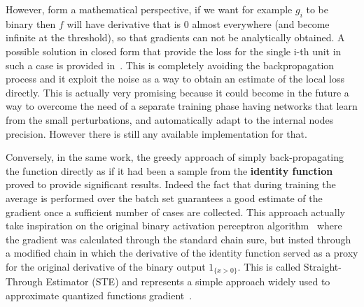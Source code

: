 However, form a mathematical perspective, if we want for example $g_i$ to be binary then $f$ will have derivative that is 0 almost everywhere (and become infinite at the threshold), so that gradients can not be analytically obtained.
A possible solution in closed form that provide the loss for the single i-th unit in such a case is provided in~\cite{bengio2013estimating}. This is completely avoiding the backpropagation process and it exploit the noise as a way to obtain an estimate of the local loss directly. This is actually very promising because it could become in the future a way to overcome the need of a separate training phase having networks that learn from the small perturbations, and automatically adapt to the internal nodes precision. However there is still any available implementation for that.

Conversely, in the same work, the greedy approach of simply back-propagating the function directly as if it had been a sample from the \textbf{identity function} proved to provide significant results. Indeed the fact that during training the average is performed over the batch set guarantees a good estimate of the gradient once a sufficient number of cases are collected.
This approach actually take inspiration on the original binary activation perceptron algorithm~\cite{Rosenblatt58theperceptron} where the gradient was calculated through the standard chain sure, but insted through a modified chain in which the derivative of the identity function served as a proxy for the original derivative of the binary output $1_{\{x>0\}}$.
This is called Straight-Through Estimator (STE) and represents a simple approach widely used to approximate quantized functions gradient~\cite{yin2019understanding}.


